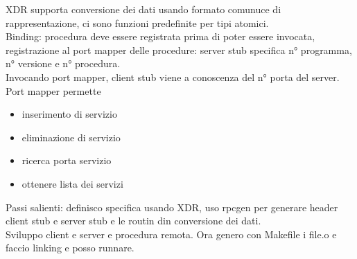 \documentclass{article}
\begin{document}
XDR supporta conversione dei dati usando formato comunuce di rappresentazione, ci sono funzioni predefinite per tipi atomici.\\ Binding: procedura deve essere registrata prima di poter essere invocata, registrazione al port mapper delle procedure: server stub specifica n° programma, n° versione e n° procedura.\\ Invocando port mapper, client stub viene a conoscenza del n° porta del server.\\ Port mapper permette
\begin{itemize}
\item inserimento di servizio
\item eliminazione di servizio
\item ricerca porta servizio
\item ottenere lista dei servizi
\end{itemize}
Passi salienti: definisco specifica usando XDR, uso rpcgen per generare header client stub e server stub e le routin din conversione dei dati.\\ Sviluppo client e server e procedura remota. Ora genero con Makefile i file.o e faccio linking e posso runnare.
\end{document}
